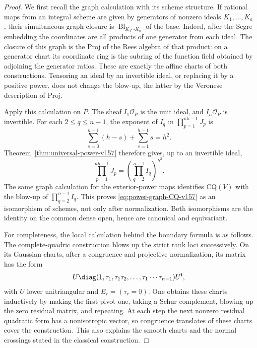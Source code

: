\documentclass[11pt,reqno]{amsart}
\numberwithin{equation}{section}
\theoremstyle{definition}\newtheorem{definition}[theorem]{Definition}
\theoremstyle{remark}\newtheorem{remark}[theorem]{Remark}
\newcommand{\OO}{\mathcal O}\newcommand{\II}{\mathcal I}
\begin{document}
\begin{proof}
We first recall the graph calculation with its scheme structure.
If rational maps from an integral scheme are given by generators of
nonzero ideals $K_1,\ldots,K_a$, their simultaneous graph closure is
$\operatorname{Bl}_{K_1\cdots K_a}$ of the base. Indeed, after the Segre
embedding the coordinates are all products of one generator from each
ideal. The closure of this graph is the Proj of the Rees algebra of
that product: on a generator chart its coordinate ring is the subring
of the function field obtained by adjoining the generator ratios.
These are exactly the affine charts of both constructions. Tensoring
an ideal by an invertible ideal, or replacing it by a positive power,
does not change the blow-up, the latter by the Veronese description
of Proj.

Apply this calculation on $P$. The sheaf $I_1\OO_P$ is the unit ideal,
and $I_n\OO_P$ is invertible. For each $2\leq q\leq n-1$, the exponent
of $I_q$ in $\prod_{p=1}^{nh-1}J_p$ is
\[
 \sum_{s=0}^{h-1}(h-s)+\sum_{s=1}^{h-1}s=h^2.
\]
Theorem~\ref{thm:universal-power-v157} therefore gives, up to an
invertible ideal,
\[
       \prod_{p=1}^{nh-1}J_p
                =\left(\prod_{q=2}^{n-1}I_q\right)^{h^2}.
\]
The same graph calculation for the exterior-power maps identifies
$\mathrm{CQ}(V)$ with the blow-up of $\prod_{q=2}^{n-1}I_q$.
This proves \eqref{eq:power-graph-CQ-v157} as an isomorphism of schemes,
not only after normalization. Both isomorphisms are the identity on
the common dense open, hence are canonical and equivariant.

For completeness, the local calculation behind the boundary formula
is as follows. The complete-quadric construction blows up the strict
rank loci successively. On its Gaussian charts, after a congruence
and projective normalization, its matrix has the form
\begin{equation}\label{eq:CQ-chart-v157}
 U\diag(1,\tau_1,\tau_1\tau_2,\ldots,
                         \tau_1\cdots\tau_{n-1})U^{\mathsf t},
\end{equation}
with $U$ lower unitriangular and $E_r=(\tau_r=0)$.
One obtains these charts inductively by making the first pivot one,
taking a Schur complement, blowing up the zero residual matrix, and
repeating. At each step the next nonzero residual quadratic form has
a nonisotropic vector, so congruence translates of these charts cover
the construction. This also explains the smooth charts and the normal
crossings stated in the classical construction.


\end{proof}
\end{document}
